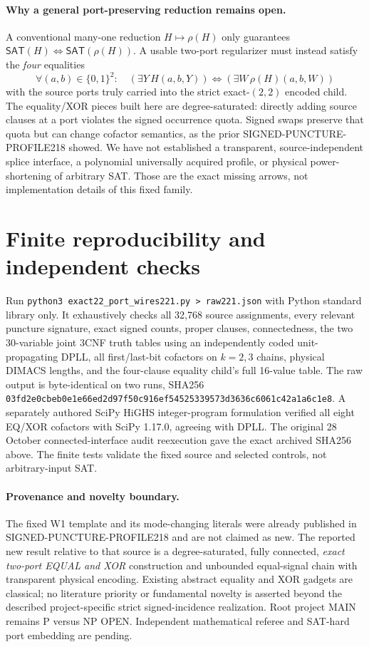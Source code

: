 \documentclass[11pt]{article}
\newcommand{\SAT}{\mathsf{SAT}}
\begin{document}
\paragraph{Why a general port-preserving reduction remains open.}
A conventional many-one reduction $H\mapsto\rho(H)$ only guarantees $\SAT(H)\iff\SAT(\rho(H))$. A usable two-port regularizer must instead satisfy the \emph{four} equalities
\[
 \forall(a,b)\in\{0,1\}^2:\quad
   (\exists Y\,H(a,b,Y))\iff(\exists W\,\rho(H)(a,b,W))
\]
with the source ports truly carried into the strict exact-$(2,2)$ encoded child. The equality/XOR pieces built here are degree-saturated: directly adding source clauses at a port violates the signed occurrence quota. Signed swaps preserve that quota but can change cofactor semantics, as the prior SIGNED-PUNCTURE-PROFILE218 showed. We have not established a transparent, source-independent splice interface, a polynomial universally acquired profile, or physical power-shortening of arbitrary SAT. Those are the exact missing arrows, not implementation details of this fixed family.

\section{Finite reproducibility and independent checks}
Run \texttt{python3 exact22\_port\_wires221.py > raw221.json} with Python standard library only. It exhaustively checks all 32,768 source assignments, every relevant puncture signature, exact signed counts, proper clauses, connectedness, the two 30-variable joint 3CNF truth tables using an independently coded unit-propagating DPLL, all first/last-bit cofactors on $k=2,3$ chains, physical DIMACS lengths, and the four-clause equality child's full 16-value table. The raw output is byte-identical on two runs, SHA256 \texttt{03fd2e0cbeb0e1e66ed2d97f50c916ef54525339573d3636c6061c42a1a6c1e8}. A separately authored SciPy HiGHS integer-program formulation verified all eight EQ/XOR cofactors with SciPy 1.17.0, agreeing with DPLL. The original 28 October connected-interface audit reexecution gave the exact archived SHA256 above. The finite tests validate the fixed source and selected controls, not arbitrary-input SAT.

\paragraph{Provenance and novelty boundary.}
The fixed W1 template and its mode-changing literals were already published in SIGNED-PUNCTURE-PROFILE218 and are not claimed as new. The reported new result relative to that source is a degree-saturated, fully connected, \emph{exact two-port EQUAL and XOR} construction and unbounded equal-signal chain with transparent physical encoding. Existing abstract equality and XOR gadgets are classical; no literature priority or fundamental novelty is asserted beyond the described project-specific strict signed-incidence realization. Root project MAIN remains P versus NP OPEN. Independent mathematical referee and SAT-hard port embedding are pending.



\end{document}
